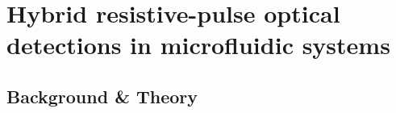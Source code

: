 \graphicspath{{../images/ch5/}}	%


\chapter{Hybrid resistive-pulse optical detections in microfluidic systems}
\label{chap:rpim}

	

	\section{Background \& Theory}
	      


